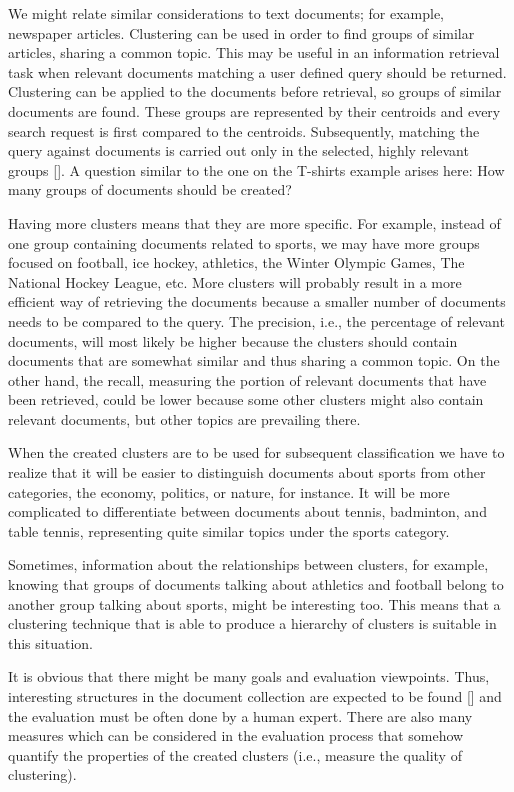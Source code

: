 We might relate similar considerations to text documents; for example, newspaper articles. Clustering can be used in order to find groups of similar articles, sharing a common topic. This may be useful in an information retrieval task when relevant documents matching a user defined query should be returned. Clustering can be applied to the documents before retrieval, so groups of similar documents are found. These groups are represented by their centroids and every search request is first compared to the centroids. Subsequently, matching the query against documents is carried out only in the selected, highly relevant groups [\cite{ref234}]. A question similar to the one on the T-shirts example arises here: How many groups of documents should be created?

Having more clusters means that they are more specific. For example, instead of one group containing documents related to sports, we may have more groups focused on football, ice hockey, athletics, the Winter Olympic Games, The National Hockey League, etc. More clusters will probably result in a more efficient way of retrieving the documents because a smaller number of documents needs to be compared to the query. The precision, i.e., the percentage of relevant documents, will most likely be higher because the clusters should contain documents that are somewhat similar and thus sharing a common topic. On the other hand, the recall, measuring the portion of relevant documents that have been retrieved, could be lower because some other clusters might also contain relevant documents, but other topics are prevailing there.

When the created clusters are to be used for subsequent classification we have to realize that it will be easier to distinguish documents about sports from other categories, the economy, politics, or nature, for instance. It will be more complicated to differentiate between documents about tennis, badminton, and table tennis, representing quite similar topics under the sports category.

Sometimes, information about the relationships between clusters, for example, knowing that groups of documents talking about athletics and football belong to another group talking about sports, might be interesting too. This means that a clustering technique that is able to produce a hierarchy of clusters is suitable in this situation.

It is obvious that there might be many goals and evaluation viewpoints. Thus, interesting structures in the document collection are expected to be found [\cite{ref274}] and the evaluation must be often done by a human expert. There are also many measures which can be considered in the evaluation process that somehow quantify the properties of the created clusters (i.e., measure the quality of clustering).

